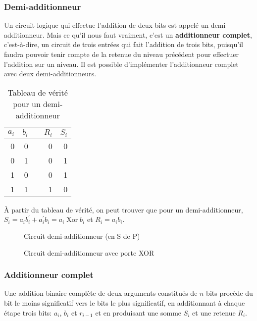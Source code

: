 \documentclass[11pt]{article}
\begin{document}
\subsubsection{Demi-additionneur}
\label{sec:org7828e1c}

Un circuit logique qui effectue l'addition de deux bits est appelé un
demi-additionneur. Mais ce qu'il nous faut vraiment, c'est un
\textbf{additionneur complet}, c'est-à-dire, un circuit de trois entrées qui
fait l’addition de trois bits, puisqu'il faudra pouvoir tenir compte
de la retenue du niveau précédent pour effectuer l'addition sur un
niveau. Il est possible d'implémenter l'additionneur complet avec deux
demi-additionneurs.

\begin{table}[htbp]
\caption{\label{tab:orge5f9965}Tableau de vérité pour un demi-additionneur}
\centering
\begin{tabular}{rrlrr}
\(a_{i}\) & \(b_{i}\) &  & \(R_{i}\) & \(S_{i}\)\\
\hline
0 & 0 &  & 0 & 0\\
0 & 1 &  & 0 & 1\\
1 & 0 &  & 0 & 1\\
1 & 1 &  & 1 & 0\\
\end{tabular}
\end{table}


À partir du tableau de vérité, on peut trouver que pour un
demi-additionneur, \(S_{i} = a_i b_i^\prime + a_i^\prime b_i = a_i
\operatorname{Xor} b_i\) et \(R_{i} = a_i b_i\).

\begin{figure}[htbp]
\centering

\caption{\label{fig:orged4040c}Circuit demi-additionneur (en S de P)}
\end{figure}


\begin{figure}[htbp]
\centering

\caption{\label{fig:org4b4d9f3}Circuit demi-additionneur avec porte XOR}
\end{figure}

\subsubsection{Additionneur complet}
\label{sec:orgcf4c9d4}

Une addition binaire complète de deux arguments constitués de \(n\)
bits procède du bit le moins significatif vers le bits le plus
significatif, en additionnant à chaque étape trois bits: \(a_{i}\),
\(b_{i}\) et \(r_{i-1}\) et en produisant une somme \(S_{i}\) et une
retenue \(R_{i}\).
\end{document}
